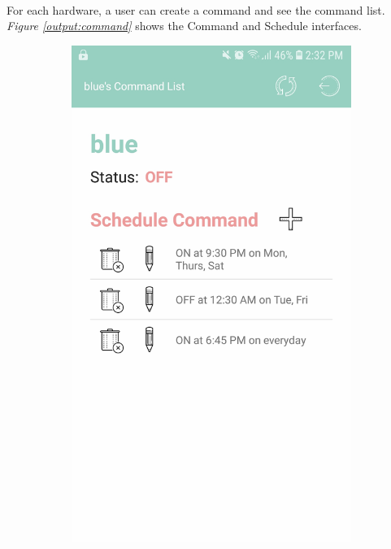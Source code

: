 \documentclass[12pt]{paper}
\begin{document}
		\paragraph{} For each hardware, a user can create a command and see the command list. \textit{Figure \ref{output:command}} shows the Command and Schedule interfaces. 
		\begin{figure}[H]
			\centering
			\begin{subfigure}[b]{.35\linewidth}
				\includegraphics[width=\linewidth]{img/output_command_list.jpg}

\end{subfigure}
\end{figure}
\end{document}
